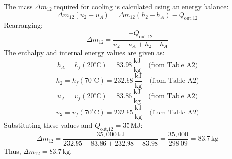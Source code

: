 The mass \( \Delta m_{12} \) required for cooling is calculated using an energy balance:  
\[
\Delta m_{12} (u_2 - u_A) = \Delta m_{12} (h_2 - h_A) - Q_{\text{out,12}}
\]  
Rearranging:  
\[
\Delta m_{12} = \frac{-Q_{\text{out,12}}}{u_2 - u_A + h_2 - h_A}
\]  
The enthalpy and internal energy values are given as:  
\[
h_A = h_f(20^\circ\text{C}) = 83.98 \, \frac{\text{kJ}}{\text{kg}} \quad \text{(from Table A2)}
\]  
\[
h_2 = h_f(70^\circ\text{C}) = 232.98 \, \frac{\text{kJ}}{\text{kg}} \quad \text{(from Table A2)}
\]  
\[
u_A = u_f(20^\circ\text{C}) = 83.86 \, \frac{\text{kJ}}{\text{kg}} \quad \text{(from Table A2)}
\]  
\[
u_2 = u_f(70^\circ\text{C}) = 232.95 \, \frac{\text{kJ}}{\text{kg}} \quad \text{(from Table A2)}
\]  
Substituting these values and \( Q_{\text{out,12}} = 35 \, \text{MJ} \):  
\[
\Delta m_{12} = \frac{35,000 \, \text{kJ}}{232.95 - 83.86 + 232.98 - 83.98} = \frac{35,000}{298.09} = 83.7 \, \text{kg}
\]  
Thus, \( \Delta m_{12} = 83.7 \, \text{kg} \).